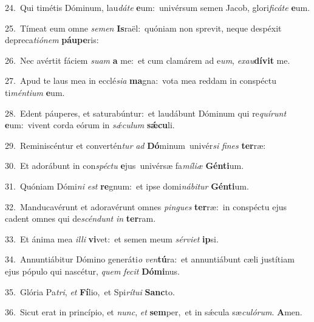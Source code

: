{\numbfont\textcolor{\numbcolor}{24.}}~Qui timétis Dóminum, lau\-\textit{dá}\-\textit{te} \textbf{e}\-um:~\star univérsum semen Jacob, glori\-\textit{fi}\-\textit{cá}\textit{te} \textbf{e}\-um.\par
{\numbfont\textcolor{\numbcolor}{25.}}~Tímeat eum omne \textit{se}\-\textit{men} \textbf{Is}\-raël:~\star quóniam non sprevit, neque despéxit depreca\-\textit{ti}\-\textit{ó}\textit{nem} \textbf{páu}\-\textbf{pe}ris:\par
{\numbfont\textcolor{\numbcolor}{26.}}~Nec avértit fáciem \textit{su}\-\textit{am} \textbf{a} me:~\star et cum clamárem ad e\-\textit{um}\-, \textit{ex}\-\textit{au}\textbf{dí}\textbf{vit} me.\par
{\numbfont\textcolor{\numbcolor}{27.}}~Apud te laus mea in ecclé\-\textit{si}\-\textit{a} \textbf{ma}\-gna:~\star vota mea reddam in conspéctu ti\-\textit{mén}\-\textit{ti}\textit{um} \textbf{e}\-um.\par
{\numbfont\textcolor{\numbcolor}{28.}}~Edent páuperes, et saturabúntur:~\dagger et laudábunt Dóminum qui re\-\textit{quí}\-\textit{runt} \textbf{e}\-um:~\star vivent corda eórum in \textit{sǽ}\-\textit{cu}\textit{lum} \textbf{sǽ}\-\textbf{cu}li.\par
{\numbfont\textcolor{\numbcolor}{29.}}~Reminiscéntur et convertén\textit{tur} \textit{ad} \textbf{Dó}\-minum~\star univér\textit{si} \textit{fi}\-\textit{nes} \textbf{ter}\-ræ:\par
{\numbfont\textcolor{\numbcolor}{30.}}~Et adorábunt in con\-\textit{spéc}\-\textit{tu} \textbf{e}\-jus~\star univérsæ fa\-\textit{mí}\-\textit{li}\textit{æ} \textbf{Gén}\-\textbf{ti}um.\par
{\numbfont\textcolor{\numbcolor}{31.}}~Quóniam Dómi\textit{ni} \textit{est} \textbf{re}\-gnum:~\star et ipse domi\-\textit{ná}\-\textit{bi}\textit{tur} \textbf{Gén}\-\textbf{ti}um.\par
{\numbfont\textcolor{\numbcolor}{32.}}~Manducavérunt et adoravérunt omnes \textit{pin}\-\textit{gues} \textbf{ter}\-ræ:~\star in conspéctu ejus cadent omnes qui de\-\textit{scén}\-\textit{dunt} \textit{in} \textbf{ter}\-ram.\par
{\numbfont\textcolor{\numbcolor}{33.}}~Et ánima mea \textit{il}\-\textit{li} \textbf{vi}\-vet:~\star et semen meum \textit{sér}\-\textit{vi}\textit{et} \textbf{ip}\-si.\par
{\numbfont\textcolor{\numbcolor}{34.}}~Annuntiábitur Dómino generáti\textit{o} \textit{ven}\-\textbf{tú}ra:~\star et annuntiábunt cæli justítiam ejus pópulo qui nascétur, \textit{quem} \textit{fe}\-\textit{cit} \textbf{Dó}\-\textbf{mi}nus.\par
{\numbfont\textcolor{\numbcolor}{35.}}~Glória Pa\-\textit{tri}\-, \textit{et} \textbf{Fí}\-lio,~\star et Spi\-\textit{rí}\-\textit{tu}\textit{i} \textbf{Sanc}\-to.\par
{\numbfont\textcolor{\numbcolor}{36.}}~Sicut erat in princípio, et \textit{nunc}\-, \textit{et} \textbf{sem}\-per,~\star et in sǽcula sæ\-\textit{cu}\-\textit{ló}\textit{rum}. \textbf{A}\-men.\par
